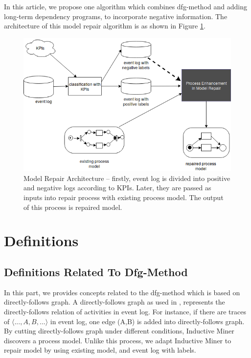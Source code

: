 \documentclass[]{article}
\begin{document}
In this article, we propose one algorithm which combines dfg-method and adding long-term dependency programs, to incorporate negative information. The architecture of this model repair algorithm is as shown in Figure \ref{fig:architecture_blackbox}.
\begin{figure}[!h]
	\includegraphics[width=\textwidth]{FD00_approach_blackbox.png} 
	\caption[Model Repair Architecture]{Model Repair Architecture -- \small firstly, event log is divided into positive and negative logs according to KPIs. Later, they are passed as inputs into repair process with existing process model. The output of this process is repaired model.}
	\label{fig:architecture_blackbox}
\end{figure}

\section{Definitions}
\subsection{Definitions Related To Dfg-Method}
In this part, we provides concepts related to the dfg-method which is based on directly-follows graph. A directly-follows graph as used in \cite{leemans2013discovering}, represents the directly-follows relation of activities in event log. For instance, if there are traces of $\langle ...,A,B,... \rangle$ in event log, one edge (A,B) is added into directly-follows graph. By cutting directly-follows graph under different conditions, Inductive Miner\cite{leemans2013discovering,leemans2014discovering} discovers a process model. Unlike this process, we adapt Inductive Miner to repair model by using existing model, and event log with labels.
 
\end{document}
